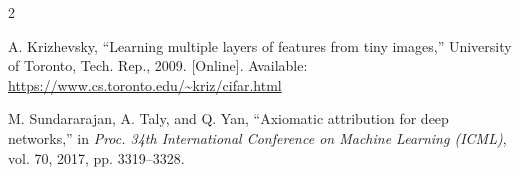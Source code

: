 \documentclass[conference]{IEEEtran}
\begin{document}
\begin{thebibliography}{2}

A. Krizhevsky,
``Learning multiple layers of features from tiny images,''
University of Toronto, Tech. Rep., 2009.
[Online]. Available:
\url{https://www.cs.toronto.edu/~kriz/cifar.html}

M. Sundararajan, A. Taly, and Q. Yan,
``Axiomatic attribution for deep networks,''
in \emph{Proc. 34th International Conference on Machine Learning (ICML)},
vol. 70, 2017, pp. 3319--3328.

\end{thebibliography}
\end{document}
